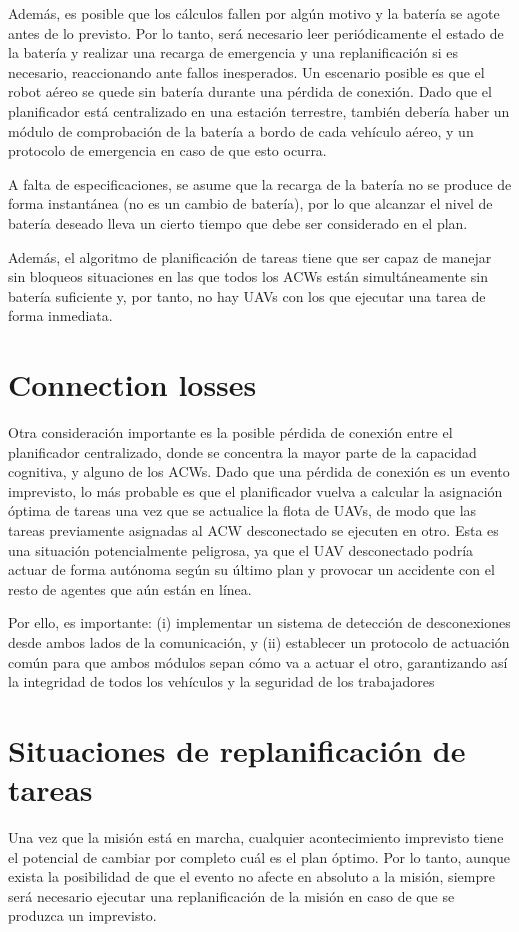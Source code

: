 \documentclass[fontsize=11pt, English=false, Español=true, Myfinal=true, twoside, numbers=noenddot]{scrbook}
\begin{document}
{Además, es posible que los cálculos fallen por algún motivo y la batería se agote antes de lo previsto. Por lo tanto, será necesario leer periódicamente el estado de la batería y realizar una recarga de emergencia y una replanificación si es necesario, reaccionando ante fallos inesperados. Un escenario posible es que el robot aéreo se quede sin batería durante una pérdida de conexión. Dado que el planificador está centralizado en una estación terrestre, también debería haber un módulo de comprobación de la batería a bordo de cada vehículo aéreo, y un protocolo de emergencia en caso de que esto ocurra.

A falta de especificaciones, se asume que la recarga de la batería no se produce de forma instantánea (no es un cambio de batería), por lo que alcanzar el nivel de batería deseado lleva un cierto tiempo que debe ser considerado en el plan.

Además, el algoritmo de planificación de tareas tiene que ser capaz de manejar sin bloqueos situaciones en las que todos los \glspl{ACW} están simultáneamente sin batería suficiente y, por tanto, no hay \glspl{UAV} con los que ejecutar una tarea de forma inmediata.

\section{Connection losses}
\label{sec:ConnectionLosses}
Otra consideración importante es la posible pérdida de conexión entre el planificador centralizado, donde se concentra la mayor parte de la capacidad cognitiva, y alguno de los \glspl{ACW}. Dado que una pérdida de conexión es un evento imprevisto, lo más probable es que el planificador vuelva a calcular la asignación óptima de tareas una vez que se actualice la flota de \glspl{UAV}, de modo que las tareas previamente asignadas al \gls{ACW} desconectado se ejecuten en otro. Esta es una situación potencialmente peligrosa, ya que el \gls{UAV} desconectado podría actuar de forma autónoma según su último plan y provocar un accidente con el resto de agentes que aún están en línea.

Por ello, es importante: (i) implementar un sistema de detección de desconexiones desde ambos lados de la comunicación, y (ii) establecer un protocolo de actuación común para que ambos módulos sepan cómo va a actuar el otro, garantizando así la integridad de todos los vehículos y la seguridad de los trabajadores

\section{Situaciones de replanificación de tareas}
\label{sec:TaskReplanningSituations}
Una vez que la misión está en marcha, cualquier acontecimiento imprevisto tiene el potencial de cambiar por completo cuál es el plan óptimo. Por lo tanto, aunque exista la posibilidad de que el evento no afecte en absoluto a la misión, siempre será necesario ejecutar una replanificación de la misión en caso de que se produzca un imprevisto.

}
\end{document}
